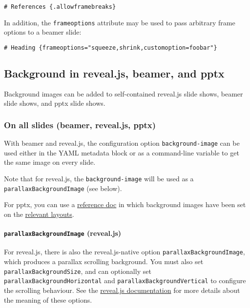 \documentclass[
  a4paper,
]{article}
\begin{document}
\begin{verbatim}
# References {.allowframebreaks}
\end{verbatim}

In addition, the \texttt{frameoptions} attribute may be used to pass
arbitrary frame options to a beamer slide:

\begin{verbatim}
# Heading {frameoptions="squeeze,shrink,customoption=foobar"}
\end{verbatim}

\hypertarget{background-in-reveal.js-beamer-and-pptx}{%
\subsection{Background in reveal.js, beamer, and
pptx}\label{background-in-reveal.js-beamer-and-pptx}}

Background images can be added to self-contained reveal.js slide shows,
beamer slide shows, and pptx slide shows.

\hypertarget{on-all-slides-beamer-reveal.js-pptx}{%
\subsubsection{On all slides (beamer, reveal.js,
pptx)}\label{on-all-slides-beamer-reveal.js-pptx}}

With beamer and reveal.js, the configuration option
\texttt{background-image} can be used either in the YAML metadata block
or as a command-line variable to get the same image on every slide.

Note that for reveal.js, the \texttt{background-image} will be used as a
\texttt{parallaxBackgroundImage} (see below).

For pptx, you can use a
\protect\hyperlink{option--reference-doc}{reference doc} in which
background images have been set on the
\protect\hyperlink{powerpoint-layout-choice}{relevant layouts}.

\hypertarget{parallaxbackgroundimage-reveal.js}{%
\paragraph{\texorpdfstring{\texttt{parallaxBackgroundImage}
(reveal.js)}{parallaxBackgroundImage (reveal.js)}}\label{parallaxbackgroundimage-reveal.js}}

For reveal.js, there is also the reveal.js-native option
\texttt{parallaxBackgroundImage}, which produces a parallax scrolling
background. You must also set \texttt{parallaxBackgroundSize}, and can
optionally set \texttt{parallaxBackgroundHorizontal} and
\texttt{parallaxBackgroundVertical} to configure the scrolling
behaviour. See the
\href{https://revealjs.com/backgrounds/\#parallax-background}{reveal.js
documentation} for more details about the meaning of these options.
\end{document}
